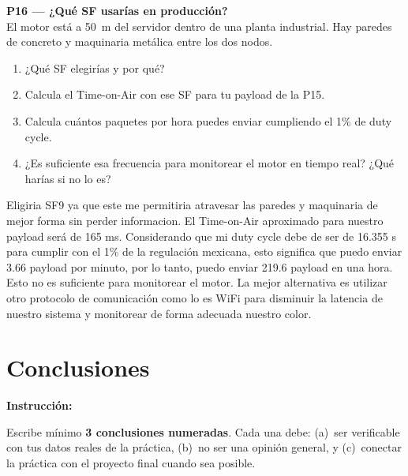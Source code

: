 \documentclass[11pt, letterpaper]{article}
\newenvironment{pregunta}[1]{%
  \begin{mdframed}[backgroundcolor=purpleLight, linecolor=purpleMain, linewidth=1pt,
    innerleftmargin=12pt, innerrightmargin=12pt,
    innertopmargin=8pt,  innerbottommargin=8pt]
  \textbf{\color{purpleMain}#1}\\[6pt]
}{\end{mdframed}\vspace{0.2cm}}
\newenvironment{instruccion}{%
  \begin{mdframed}[backgroundcolor=tealLight, linecolor=tealMain, linewidth=1pt,
    innerleftmargin=10pt, innerrightmargin=10pt,
    innertopmargin=6pt,  innerbottommargin=6pt]
  \small\textbf{\color{tealMain}Instrucci\'on:}\hspace{4pt}
}{\end{mdframed}}
\begin{document}
\begin{pregunta}{P16 --- ¿Qué SF usarías en producci\'on?}
  El motor est\'a a 50~m del servidor dentro de una planta industrial.
  Hay paredes de concreto y maquinaria met\'alica entre los dos nodos.
  \begin{enumerate}[leftmargin=1.5cm, label=\alph*)]
    \item ¿Qu\'e SF elegir\'ias y por qu\'e?
    \item Calcula el Time-on-Air con ese SF para tu payload de la P15.
    \item Calcula cu\'antos paquetes por hora puedes enviar cumpliendo
          el 1\% de duty cycle.
    \item ¿Es suficiente esa frecuencia para monitorear el motor en tiempo real?
          ¿Qu\'e har\'ias si no lo es?
  \end{enumerate}
\end{pregunta}

Eligiria SF9 ya que este me permitiria atravesar las paredes y maquinaria de mejor forma sin perder informacion.
El Time-on-Air aproximado para nuestro payload será de 165 ms.
Considerando que mi duty cycle debe de ser de 16.355 s para cumplir con el 1\% de la regulación mexicana, esto significa que puedo enviar 3.66 payload por minuto, por lo tanto, puedo enviar 219.6 payload en una hora.
Esto no es suficiente para monitorear el motor. La mejor alternativa es utilizar otro protocolo de comunicación como lo es WiFi para disminuir la latencia de nuestro sistema y monitorear de forma adecuada nuestro color.


\section{Conclusiones}

\begin{instruccion}
  Escribe m\'inimo \textbf{3 conclusiones numeradas}. Cada una debe:
  (a)~ser verificable con tus datos reales de la pr\'actica,
  (b)~no ser una opini\'on general, y
  (c)~conectar la pr\'actica con el proyecto final cuando sea posible.
\end{instruccion}
\end{document}
